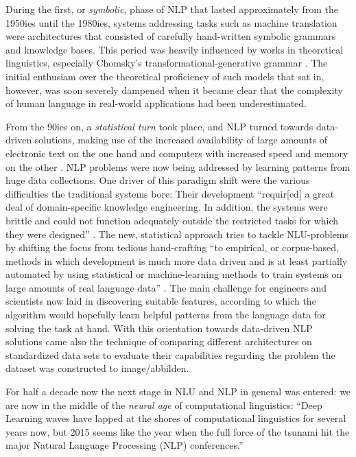 
During the first, or \emph{symbolic}, phase of NLP that lasted approximately from the 1950ies
until the 1980ies, systems addressing tasks such as machine translation were architectures that
consisted of carefully hand-written symbolic grammars and knowledge bases. This period was heavily
influenced by works in theoretical linguistics, especially Chomsky's transformational-generative
grammar \citep{chomsky2009syntactic,chomsky2014aspects}. The initial enthusiam over the theoretical
proficiency of such models that sat in, however, was soon severely dampened when it became clear
that the complexity of human language in real-world applications had been underestimated.


From the 90ies on, a \emph{statistical turn} took place, and NLP turned
towards data-driven solutions, making use of the increased availability of large
amounts of electronic text on the one hand and computers with increased speed and
memory on the other \citep{liddy2001natural}.
NLP problems were now being addressed by learning patterns from huge data collections. One driver
of this paradigm shift were the various difficulties the traditional systems bore: Their
development ``requir[ed] a great deal of domain-specific knowledge engineering. In addition,
the systems were brittle and could not function adequately outside the restricted tasks for
which they were designed'' \citep[p.~13]{brill1997overview}. The new, statistical {\color{red}
approach} tries to tackle NLU-problems by shifting the focus from tedious hand-crafting ``to
empirical, or corpus-based, methods in which development is much more data driven and is at
least partially automated by using statistical or machine-learning methods to train systems
on large amounts of real language data'' \citep[p.~13]{brill1997overview}. The main challenge
for engineers and scientists now laid in discovering suitable features, according to which the
algorithm would hopefully learn helpful patterns from the language data for solving the task
at hand. With this orientation towards data-driven NLP solutions came also the {\color{red} technique} of
comparing different architectures on standardized data sets to evaluate their capabilities regarding
the problem the dataset was constructed to {\color{red} image/abbilden}.

For half a decade now the next stage in NLU and NLP in general was entered: we are now in the
middle of the \emph{neural age} of computational linguistics:
{\color{red} ``Deep Learning waves have lapped at the shores of computational linguistics for several
years now, but 2015 seems like the year when the full force of the tsunami hit the
major Natural Language Processing (NLP) conferences.'' \citep[p.~701]{manning2015computational}}

